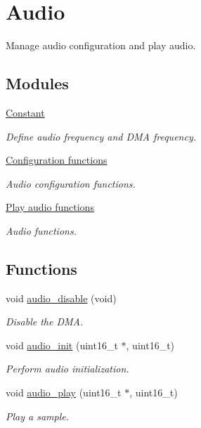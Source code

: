 \hypertarget{group___audio}{}\section{Audio}
\label{group___audio}


Manage audio configuration and play audio.  


\subsection*{Modules}
\begin{DoxyCompactItemize}
\item 
\hyperlink{group___constant}{Constant}
\begin{DoxyCompactList}\small\item\em Define audio frequency and D\+MA frequency. \end{DoxyCompactList}\item 
\hyperlink{group___audio___init}{Configuration functions}
\begin{DoxyCompactList}\small\item\em Audio configuration functions. \end{DoxyCompactList}\item 
\hyperlink{group___audio___play}{Play audio functions}
\begin{DoxyCompactList}\small\item\em Audio functions. \end{DoxyCompactList}\end{DoxyCompactItemize}
\subsection*{Functions}
\begin{DoxyCompactItemize}
\item 
void \hyperlink{group___audio_gafff6cd7f4332d078ce0114143cd30998}{audio\+\_\+disable} (void)
\begin{DoxyCompactList}\small\item\em Disable the D\+MA. \end{DoxyCompactList}\item 
void \hyperlink{group___audio_ga6a621a84280fa05373990982dacce11b}{audio\+\_\+init} (uint16\+\_\+t $\ast$, uint16\+\_\+t)
\begin{DoxyCompactList}\small\item\em Perform audio initialization. \end{DoxyCompactList}\item 
void \hyperlink{group___audio_ga286b07d3729ae2bfdf88bcd777dd93cf}{audio\+\_\+play} (uint16\+\_\+t $\ast$, uint16\+\_\+t)
\begin{DoxyCompactList}\small\item\em Play a sample. \end{DoxyCompactList}\end{DoxyCompactItemize}


